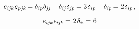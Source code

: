\nopagebreak\vspace{-0.8em}
\begin{equation*}
e_{i\hspace{-0.1ex}j\hspace{-0.1ex}k} \hspace{.1ex} e_{pj\hspace{-0.1ex}k} \hspace{-0.15ex}
= \delta_{ip} \delta_{\hspace{-0.1ex}j\hspace{-0.12ex}j} \hspace{-0.2ex} - \hspace{.1ex} \delta_{i\hspace{-0.1ex}j} \delta_{\hspace{-0.1ex}j\hspace{-0.1ex}p} \hspace{-0.15ex}
= \hspace{.1ex} 3 \hspace{.2ex} \delta_{ip} \hspace{-0.2ex} - \delta_{ip} \hspace{-0.15ex}
= \hspace{.1ex} 2 \hspace{.1ex} \delta_{ip}
\hspace{.2ex} ,
\end{equation*}

\nopagebreak\vspace{-0.8em}
\begin{equation*}
e_{i\hspace{-0.1ex}j\hspace{-0.1ex}k} \hspace{.1ex} e_{i\hspace{-0.1ex}j\hspace{-0.1ex}k} \hspace{-0.15ex}
= \hspace{.1ex} 2 \hspace{.2ex} \delta_{ii} \hspace{-0.15ex}
= \hspace{.1ex} 6
\end{equation*}

\vspace{-0.4em}\noindent
{}

